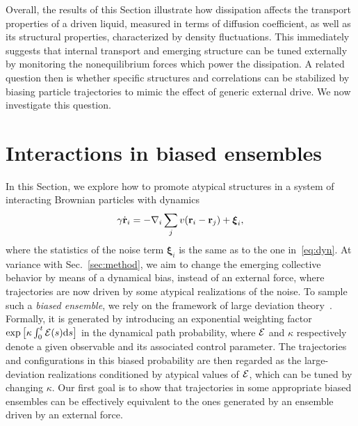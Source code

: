 \documentclass[pre, superscriptaddress, twocolumn,pre]{revtex4-1}
\begin{document}
Overall, the results of this Section illustrate how dissipation affects the transport properties of a driven liquid, measured in terms of diffusion coefficient, as well as its structural properties, characterized by density fluctuations. This immediately suggests that internal transport and emerging structure can be tuned externally by monitoring the nonequilibrium forces which power the dissipation. A related question then is whether specific structures and correlations can be stabilized by biasing particle trajectories to mimic the effect of generic external drive. We now investigate this question. 




\section{Interactions in biased ensembles}\label{sec:bias}

In this Section, we explore how to promote atypical structures in a system of interacting Brownian particles with dynamics
\begin{equation}\label{eq:dyn_eq}
	\gamma\dot{\bf r}_i = - \nabla_i \sum_j v({\bf r}_i-{\bf r}_j) + {\boldsymbol\xi}_i ,
\end{equation}
where the statistics of the noise term ${\boldsymbol\xi}_i$ is the same as to the one in~\eqref{eq:dyn}. At variance with Sec.~\ref{sec:method}, we aim to change the emerging collective behavior by means of a dynamical bias, instead of an external force, where trajectories are now driven by some atypical realizations of the noise. To sample such a {\it biased ensemble}, we rely on the framework of large deviation theory~\cite{Chetrite2013, Jack2010}. Formally, it is generated by introducing an exponential weighting factor $\exp\big[\kappa\int_0^t{\cal E}(s){\rm d}s\big]$ in the dynamical path probability, where $\cal E$ and $\kappa$ respectively denote a given observable and its associated control parameter. The trajectories and configurations in this biased probability are then regarded as the large-deviation realizations conditioned by atypical values of $\cal E$, which can be tuned by changing $\kappa$. Our first goal is to show that trajectories in some appropriate biased ensembles  can be effectively equivalent to the ones generated by an ensemble driven by an external force.
\end{document}
